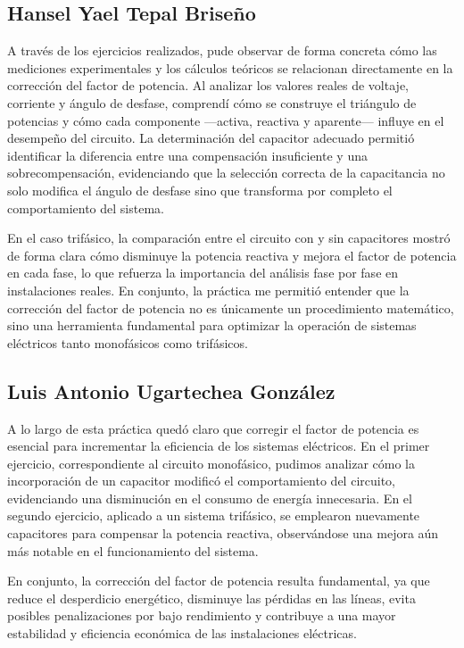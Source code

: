 \documentclass[12pt, letterpaper]{article}
\begin{document}
\subsection*{Hansel Yael Tepal Briseño}

A través de los ejercicios realizados, pude observar de forma concreta cómo las mediciones experimentales y los cálculos teóricos se relacionan directamente en la corrección del factor de potencia. Al analizar los valores reales de voltaje, corriente y ángulo de desfase, comprendí cómo se construye el triángulo de potencias y cómo cada componente —activa, reactiva y aparente— influye en el desempeño del circuito. La determinación del capacitor adecuado permitió identificar la diferencia entre una compensación insuficiente y una sobrecompensación, evidenciando que la selección correcta de la capacitancia no solo modifica el ángulo de desfase sino que transforma por completo el comportamiento del sistema.

En el caso trifásico, la comparación entre el circuito con y sin capacitores mostró de forma clara cómo disminuye la potencia reactiva y mejora el factor de potencia en cada fase, lo que refuerza la importancia del análisis fase por fase en instalaciones reales. En conjunto, la práctica me permitió entender que la corrección del factor de potencia no es únicamente un procedimiento matemático, sino una herramienta fundamental para optimizar la operación de sistemas eléctricos tanto monofásicos como trifásicos.

\subsection*{Luis Antonio Ugartechea González}

A lo largo de esta práctica quedó claro que corregir el factor de potencia es esencial para incrementar la eficiencia de los sistemas eléctricos. En el primer ejercicio, correspondiente al circuito monofásico, pudimos analizar cómo la incorporación de un capacitor modificó el comportamiento del circuito, evidenciando una disminución en el consumo de energía innecesaria. En el segundo ejercicio, aplicado a un sistema trifásico, se emplearon nuevamente capacitores para compensar la potencia reactiva, observándose una mejora aún más notable en el funcionamiento del sistema.

En conjunto, la corrección del factor de potencia resulta fundamental, ya que reduce el desperdicio energético, disminuye las pérdidas en las líneas, evita posibles penalizaciones por bajo rendimiento y contribuye a una mayor estabilidad y eficiencia económica de las instalaciones eléctricas.
\end{document}
